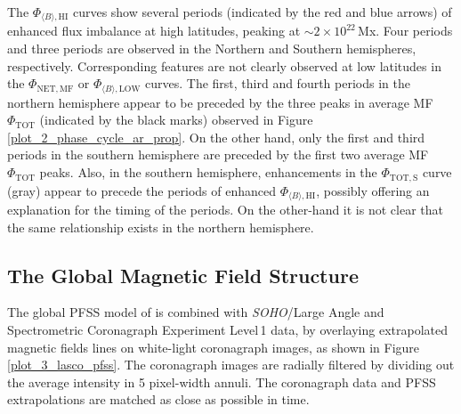 \documentclass[namedreferences]{solarphysics}
\begin{document}
\begin{article}
The $\Phi_{\langle B \rangle,\mathrm{HI}}$ curves show several periods (indicated by the red and blue arrows) of enhanced flux imbalance at high latitudes, peaking at $\sim$$2\times10^{22}$\,Mx. Four periods and three periods are observed in the Northern and Southern hemispheres, respectively. Corresponding features are not clearly observed at low latitudes in the $\Phi_{\mathrm{NET,MF}}$ or $\Phi_{\langle B \rangle,\mathrm{LOW}}$ curves. The first, third and fourth periods in the northern hemisphere appear to be preceded by the three peaks in average MF $\Phi_\mathrm{TOT}$ (indicated by the black marks) observed in Figure\,\ref{plot_2_phase_cycle_ar_prop}. On the other hand, only the first and third periods in the southern hemisphere are preceded by the first two average MF $\Phi_\mathrm{TOT}$ peaks. Also, in the southern hemisphere, enhancements in the $\Phi_{\mathrm{TOT,S}}$ curve (gray) appear to precede the periods of enhanced $\Phi_{\langle B \rangle,\mathrm{HI}}$, possibly offering an explanation for the timing of the periods. On the other-hand it is not clear that the same relationship exists in the northern hemisphere.



\subsection{The Global Magnetic Field Structure}


The global PFSS model of \citet{Schrijver:2003} is combined with \emph{SOHO}/Large Angle and Spectrometric Coronagraph Experiment \citep[LASCO;][]{brueckner:1995} Level\,1 data, by overlaying extrapolated magnetic fields lines on white-light coronagraph images, as shown in Figure\,\ref{plot_3_lasco_pfss}. The coronagraph images are radially filtered by dividing out the average intensity in 5 pixel-width annuli. The coronagraph data and PFSS extrapolations are matched as close as possible in time. 



\end{article}
\end{document}
